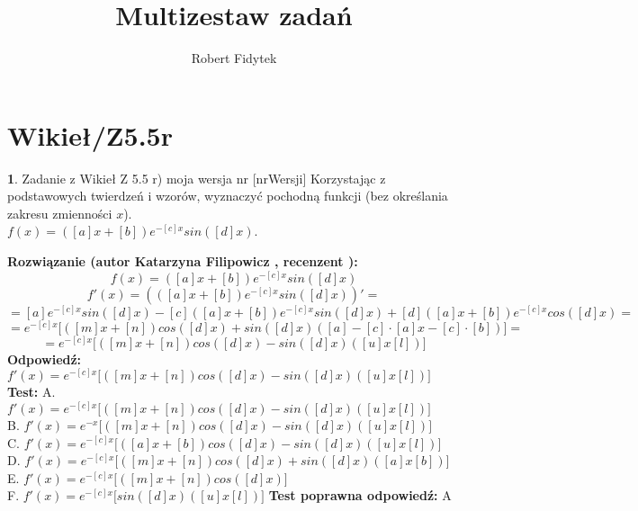 \documentclass[12pt, a4paper]{article}
\title{Multizestaw zadań}
\author{Robert Fidytek}
\date{}
\theoremstyle{definition} %
\newtheorem{zad}{}
\newcommand{\kategoria}[1]{\section{#1}} %
\newcommand{\zadStart}[1]{\begin{zad}#1\newline} %
\newcommand{\zadStop}{\end{zad}}   %
\newcommand{\rozwStart}[2]{\noindent \textbf{Rozwiązanie (autor #1 , recenzent #2): }\newline} %
\newcommand{\rozwStop}{\newline}                                            %
\newcommand{\odpStart}{\noindent \textbf{Odpowiedź:}\newline}    %
\newcommand{\odpStop}{\newline}                                             %
\newcommand{\testStart}{\noindent \textbf{Test:}\newline} %
\newcommand{\testStop}{\newline} %
\newcommand{\kluczStart}{\noindent \textbf{Test poprawna odpowiedź:}\newline} %
\newcommand{\kluczStop}{\newline} %
\begin{document}
\maketitle


\kategoria{Wikieł/Z5.5r}
\zadStart{Zadanie z Wikieł Z 5.5 r) moja wersja nr [nrWersji]}
Korzystając z podstawowych twierdzeń i wzorów, wyznaczyć pochodną funkcji (bez określania zakresu zmienności $x$).\\ 
$f(x)=([a]x+[b])e^{-[c]x}sin([d]x)$.
\zadStop
\rozwStart{Katarzyna Filipowicz}{}
$$f(x)=([a]x+[b])e^{-[c]x}sin([d]x)$$
$$f'(x)=\left(([a]x+[b])e^{-[c]x}sin([d]x)\right)' = $$
$$ = [a]e^{-[c]x}sin([d]x)-[c]([a]x+[b])e^{-[c]x}sin([d]x)+[d]([a]x+[b])e^{-[c]x}cos([d]x)=
$$ $$
=e^{-[c]x}\Big[([m]x+[n])cos([d]x)+sin([d]x)([a]-[c]\cdot[a]x-[c]\cdot[b])\Big]=
$$ $$
=e^{-[c]x}\Big[([m]x+[n])cos([d]x)-sin([d]x)([u]x [l])\Big]
$$
\rozwStop
\odpStart
$ f'(x)=e^{-[c]x}\Big[([m]x+[n])cos([d]x)-sin([d]x)([u]x [l])\Big]$
\odpStop
\testStart
A. $ f'(x)=e^{-[c]x}\Big[([m]x+[n])cos([d]x)-sin([d]x)([u]x [l])\Big]$\\
B. $ f'(x)=e^{-x}\Big[([m]x+[n])cos([d]x)-sin([d]x)([u]x [l])\Big]$\\
C. $ f'(x)=e^{-[c]x}\Big[([a]x+[b])cos([d]x)-sin([d]x)([u]x [l])\Big]$ \\
D. $ f'(x)=e^{-[c]x}\Big[([m]x+[n])cos([d]x)+sin([d]x)([a]x [b])\Big]$\\
E. $ f'(x)=e^{-[c]x}\Big[([m]x+[n])cos([d]x)\Big]$\\
F. $ f'(x)=e^{-[c]x}\Big[sin([d]x)([u]x [l])\Big]$
\testStop
\kluczStart
A
\kluczStop
\end{document}

